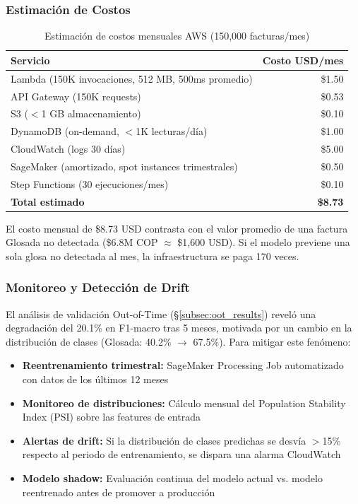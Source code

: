 \documentclass[12pt,letterpaper]{report}
\begin{document}
\subsubsection{Estimación de Costos}

\begin{table}[H]
\centering
\caption{Estimación de costos mensuales AWS (150,000 facturas/mes)}
\label{tab:aws_costos}
\small
\begin{tabular}{@{}lr@{}}
\toprule
\textbf{Servicio} & \textbf{Costo USD/mes} \\
\midrule
Lambda (150K invocaciones, 512 MB, 500ms promedio) & \$1.50 \\
API Gateway (150K requests) & \$0.53 \\
S3 ($<$1 GB almacenamiento) & \$0.10 \\
DynamoDB (on-demand, $<$1K lecturas/día) & \$1.00 \\
CloudWatch (logs 30 días) & \$5.00 \\
SageMaker (amortizado, spot instances trimestrales) & \$0.50 \\
Step Functions (30 ejecuciones/mes) & \$0.10 \\
\midrule
\textbf{Total estimado} & \textbf{\$8.73} \\
\bottomrule
\end{tabular}
\end{table}

El costo mensual de \$8.73 USD contrasta con el valor promedio de una factura Glosada no detectada (\$6.8M COP $\approx$ \$1,600 USD). Si el modelo previene una sola glosa no detectada al mes, la infraestructura se paga 170 veces.

\subsubsection{Monitoreo y Detección de Drift}

El análisis de validación Out-of-Time (§\ref{subsec:oot_results}) reveló una degradación del 20.1\% en F1-macro tras 5 meses, motivada por un cambio en la distribución de clases (Glosada: 40.2\% $\rightarrow$ 67.5\%). Para mitigar este fenómeno:

\begin{itemize}
    \item \textbf{Reentrenamiento trimestral:} SageMaker Processing Job automatizado con datos de los últimos 12 meses
    \item \textbf{Monitoreo de distribuciones:} Cálculo mensual del Population Stability Index (PSI) sobre las features de entrada
    \item \textbf{Alertas de drift:} Si la distribución de clases predichas se desvía $>$15\% respecto al periodo de entrenamiento, se dispara una alarma CloudWatch
    \item \textbf{Modelo shadow:} Evaluación continua del modelo actual vs. modelo reentrenado antes de promover a producción
\end{itemize}
\end{document}
